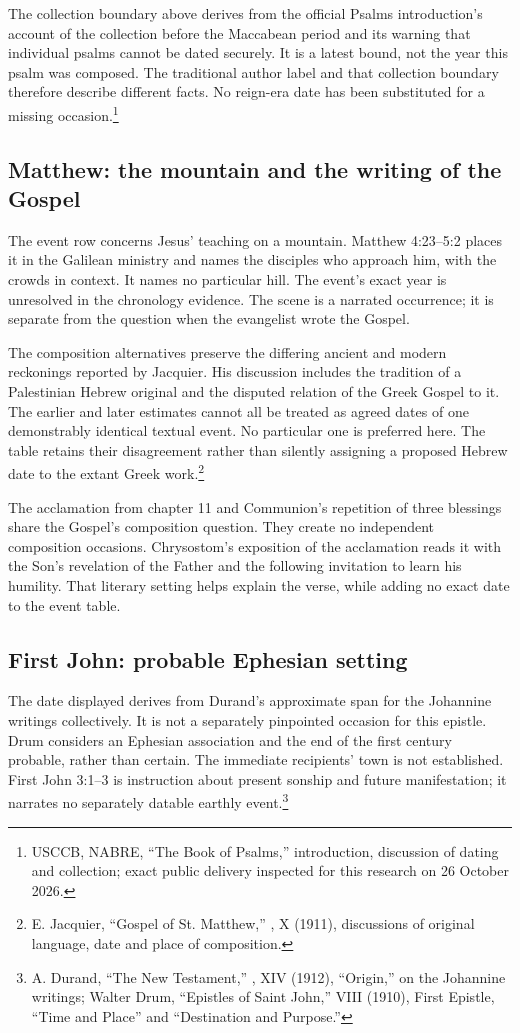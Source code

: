 The collection boundary above derives from the official Psalms introduction's account of the collection before the Maccabean period and its warning that individual psalms cannot be dated securely. It is a latest bound, not the year this psalm was composed. The traditional author label and that collection boundary therefore describe different facts. No reign-era date has been substituted for a missing occasion.\footnote{USCCB, NABRE, ``The Book of Psalms,'' introduction, discussion of dating and collection; exact public delivery inspected for this research on 26 October 2026.}

\subsection{Matthew: the mountain and the writing of the Gospel}
\label{history-matthew}
The event row concerns Jesus' teaching on a mountain. Matthew 4:23--5:2 places it in the Galilean ministry and names the disciples who approach him, with the crowds in context. It names no particular hill. The event's exact year is unresolved in the chronology evidence. The scene is a narrated occurrence; it is separate from the question when the evangelist wrote the Gospel.

The composition alternatives preserve the differing ancient and modern reckonings reported by Jacquier. His discussion includes the tradition of a Palestinian Hebrew original and the disputed relation of the Greek Gospel to it. The earlier and later estimates cannot all be treated as agreed dates of one demonstrably identical textual event. No particular one is preferred here. The table retains their disagreement rather than silently assigning a proposed Hebrew date to the extant Greek work.\footnote{E. Jacquier, ``Gospel of St. Matthew,'' , X (1911), discussions of original language, date and place of composition.}

The acclamation from chapter 11 and Communion's repetition of three blessings share the Gospel's composition question. They create no independent composition occasions. Chrysostom's exposition of the acclamation reads it with the Son's revelation of the Father and the following invitation to learn his humility. That literary setting helps explain the verse, while adding no exact date to the event table.

\subsection{First John: probable Ephesian setting}
\label{history-john}
The date displayed derives from Durand's approximate span for the Johannine writings collectively. It is not a separately pinpointed occasion for this epistle. Drum considers an Ephesian association and the end of the first century probable, rather than certain. The immediate recipients' town is not established. First John 3:1--3 is instruction about present sonship and future manifestation; it narrates no separately datable earthly event.\footnote{A. Durand, ``The New Testament,'' , XIV (1912), ``Origin,'' on the Johannine writings; Walter Drum, ``Epistles of Saint John,'' VIII (1910), First Epistle, ``Time and Place'' and ``Destination and Purpose.''}

